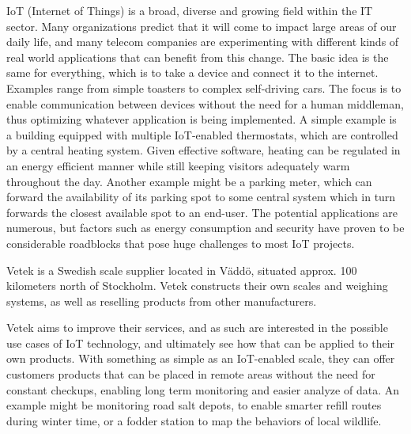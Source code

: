 






IoT (Internet of Things) is a broad, diverse and growing field within the IT sector. Many organizations predict that it will come to impact large areas of our daily life, and many telecom companies are experimenting with different kinds of real world applications that can benefit from this change. The basic idea is the same for everything, which is to take a device and connect it to the internet. Examples range from simple toasters to complex self-driving cars.\cite{what_is_iot} The focus is to enable communication between devices without the need for a human middleman, thus optimizing whatever application is being implemented. A simple example is a building equipped with multiple IoT-enabled thermostats, which are controlled by a central heating system. Given effective software, heating can be regulated in an energy efficient manner while still keeping visitors adequately warm throughout the day. Another example might be a parking meter, which can forward the availability of its parking spot to some central system which in turn forwards the closest available spot to an end-user. The potential applications are numerous, but factors such as energy consumption and security have proven to be considerable roadblocks that pose huge challenges to most IoT projects.

Vetek is a Swedish scale supplier located in Väddö, situated approx. 100 kilometers north of Stockholm. Vetek constructs their own scales and weighing systems, as well as reselling products from other manufacturers.\cite{vetek} 

Vetek aims to improve their services, and as such are interested in the possible use cases of IoT technology, and ultimately see how that can be applied to their own products. With something as simple as an IoT-enabled scale, they can offer customers products that can be placed in remote areas without the need for constant checkups, enabling long term monitoring and easier analyze of data. An example might be monitoring road salt depots, to enable smarter refill routes during winter time, or a fodder station to map the behaviors of local wildlife.

